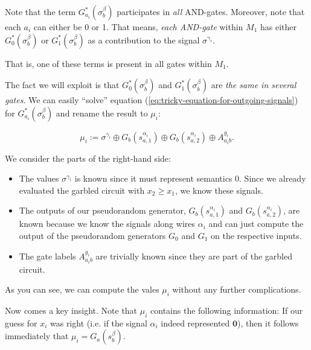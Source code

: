 Note that the term $G^*_{a_i}(\sigma^{\beta}_{b})$ participates in \emph{all} AND-gates. Moreover, note that each $a_i$ can either be 0 or 1. That means, \emph{each AND-gate} within $M_1$ has either $G^*_{0}(\sigma^{\beta}_{b})$ or $G^*_{1}(\sigma^{\beta}_{b})$ as a contribution to the signal $\sigma^{\gamma_i}$.

That is, one of these terms is present in all gates within $M_1$.

The fact we will exploit is that $G^*_{0}(\sigma^{\beta}_{b})$ and $G^*_{1}(\sigma^{\beta}_{b})$ are \emph{the same in several gates}. We can easily ``solve'' equation (\ref{eq:tricky-equation-for-outgoing-signals}) for $G^*_{a_i}(\sigma^\beta_b)$ and rename the result to $\mu_i$:

\begin{equation}
  \label{eq:mu_i-is-a-tricky-thing}
  \mu_i:=\sigma^{\gamma_i}\oplus G_b(s^{\alpha_i}_{a,1}) \oplus G_b(s^{\alpha_i}_{a,2}) \oplus A^{g_i}_{a_i b}.
\end{equation}

We consider the parts of the right-hand side:

\begin{itemize}
\item The values $\sigma^{\gamma_i}$ is known since it must represent semantics 0. Since we already evaluated the garbled circuit with $x_2\geq x_1$, we know these signals.
\item The outputs of our pseudorandom generator, $G_b(s^{\alpha_i}_{a,1})$ and $G_b(s^{\alpha_i}_{a,2})$, are known because we know the signals along wires $\alpha_i$ and can just compute the output of the pseudorandom generators $G_0$ and $G_1$ on the respective inputs.
\item The gate labels $A^{g_i}_{a_i b}$ are trivially known since they are part of the garbled circuit.
\end{itemize}

As you can see, we can compute the vales $\mu_i$ without any further complications.

Now comes a key insight. Note that $\mu_i$ contains the following information: If our guess for $x_i$ was right (i.e. if the signal $\alpha_i$ indeed represented $\mathbf{0}$), then it follows immediately that $\mu_i=G_a(s^\beta_b)$.



